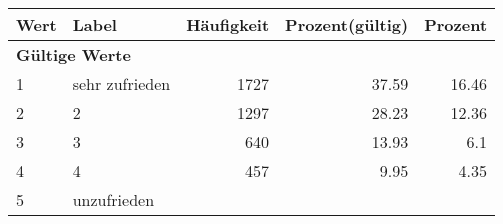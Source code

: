      \begin{longtable}{lXrrr}
     \toprule
     \textbf{Wert} & \textbf{Label} & \textbf{Häufigkeit} & \textbf{Prozent(gültig)} & \textbf{Prozent} \\
     \endhead
     \midrule
     \multicolumn{5}{l}{\textbf{Gültige Werte}}\\

     1 &
     \multicolumn{1}{X}{ sehr zufrieden   } &


       \num{1727} &
       \num[round-mode=places,round-precision=2]{37,59} &
         \num[round-mode=places,round-precision=2]{16,46} \\

     2 &
     \multicolumn{1}{X}{ 2   } &


       \num{1297} &
       \num[round-mode=places,round-precision=2]{28,23} &
         \num[round-mode=places,round-precision=2]{12,36} \\

     3 &
     \multicolumn{1}{X}{ 3   } &


       \num{640} &
       \num[round-mode=places,round-precision=2]{13,93} &
         \num[round-mode=places,round-precision=2]{6,1} \\

     4 &
     \multicolumn{1}{X}{ 4   } &


       \num{457} &
       \num[round-mode=places,round-precision=2]{9,95} &
         \num[round-mode=places,round-precision=2]{4,35} \\

     5 &
     \multicolumn{1}{X}{ unzufrieden   } &



\end{longtable}
